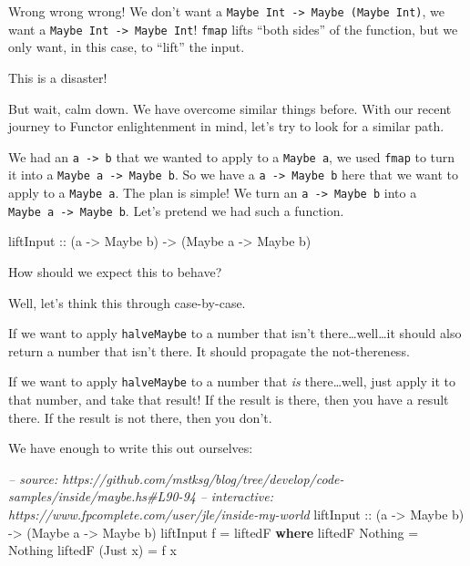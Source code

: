 \documentclass[]{article}
\newenvironment{Shaded}{}{}
\newcommand{\KeywordTok}[1]{\textcolor[rgb]{0.00,0.44,0.13}{\textbf{{#1}}}}
\newcommand{\DataTypeTok}[1]{\textcolor[rgb]{0.56,0.13,0.00}{{#1}}}
\newcommand{\CommentTok}[1]{\textcolor[rgb]{0.38,0.63,0.69}{\textit{{#1}}}}
\newcommand{\OtherTok}[1]{\textcolor[rgb]{0.00,0.44,0.13}{{#1}}}
\newcommand{\FunctionTok}[1]{\textcolor[rgb]{0.02,0.16,0.49}{{#1}}}
\newcommand{\NormalTok}[1]{{#1}}
\begin{document}
Wrong wrong wrong! We don't want a \texttt{Maybe\ Int\ -\textgreater{}\ Maybe\ (Maybe\ Int)}, we
want a \texttt{Maybe\ Int\ -\textgreater{}\ Maybe\ Int}! \texttt{fmap} lifts ``both sides'' of the
function, but we only want, in this case, to ``lift'' the input.

This is a disaster!

But wait, calm down. We have overcome similar things before. With our recent journey to Functor
enlightenment in mind, let's try to look for a similar path.

We had an \texttt{a\ -\textgreater{}\ b} that we wanted to apply to a \texttt{Maybe\ a}, we used
\texttt{fmap} to turn it into a \texttt{Maybe\ a\ -\textgreater{}\ Maybe\ b}. So we have a
\texttt{a\ -\textgreater{}\ Maybe\ b} here that we want to apply to a \texttt{Maybe\ a}. The plan is
simple! We turn an \texttt{a\ -\textgreater{}\ Maybe\ b} into a
\texttt{Maybe\ a\ -\textgreater{}\ Maybe\ b}. Let's pretend we had such a function.

\begin{Shaded}
\begin{Highlighting}[]
\OtherTok{liftInput ::} \NormalTok{(a }\OtherTok{->} \DataTypeTok{Maybe} \NormalTok{b) }\OtherTok{->} \NormalTok{(}\DataTypeTok{Maybe} \NormalTok{a }\OtherTok{->} \DataTypeTok{Maybe} \NormalTok{b)}
\end{Highlighting}
\end{Shaded}

How should we expect this to behave?

Well, let's think this through case-by-case.

If we want to apply \texttt{halveMaybe} to a number that isn't there\ldots{}well\ldots{}it should
also return a number that isn't there. It should propagate the not-thereness.

If we want to apply \texttt{halveMaybe} to a number that \emph{is} there\ldots{}well, just apply it
to that number, and take that result! If the result is there, then you have a result there. If the
result is not there, then you don't.

We have enough to write this out ourselves:

\begin{Shaded}
\begin{Highlighting}[]
\CommentTok{-- source: https://github.com/mstksg/blog/tree/develop/code-samples/inside/maybe.hs#L90-94}
\CommentTok{-- interactive: https://www.fpcomplete.com/user/jle/inside-my-world}
\OtherTok{liftInput ::} \NormalTok{(a }\OtherTok{->} \DataTypeTok{Maybe} \NormalTok{b) }\OtherTok{->} \NormalTok{(}\DataTypeTok{Maybe} \NormalTok{a }\OtherTok{->} \DataTypeTok{Maybe} \NormalTok{b)}
\NormalTok{liftInput f }\FunctionTok{=} \NormalTok{liftedF}
  \KeywordTok{where}
    \NormalTok{liftedF }\DataTypeTok{Nothing}  \FunctionTok{=} \DataTypeTok{Nothing}
    \NormalTok{liftedF (}\DataTypeTok{Just} \NormalTok{x) }\FunctionTok{=} \NormalTok{f x}
\end{Highlighting}
\end{Shaded}
\end{document}
